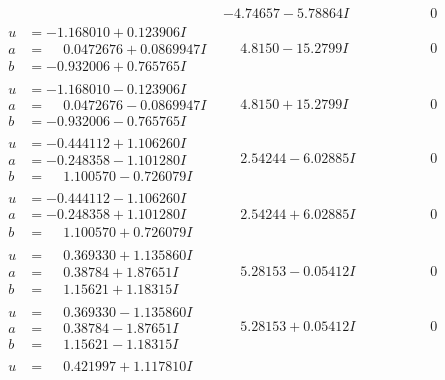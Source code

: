 \documentclass[1p]{elsarticle_modified}
\theoremstyle{definition}
\begin{document}
$$\begin{array}{c|c|c}
 & -4.74657 - 5.78864 I & \phantom{-0.000000 } 0 \\ \hline\begin{aligned}
u &= -1.168010 + 0.123906 I \\
a &= \phantom{-}0.0472676 + 0.0869947 I \\
b &= -0.932006 + 0.765765 I\end{aligned}
 & \phantom{-}4.8150 - 15.2799 I & \phantom{-0.000000 } 0 \\ \hline\begin{aligned}
u &= -1.168010 - 0.123906 I \\
a &= \phantom{-}0.0472676 - 0.0869947 I \\
b &= -0.932006 - 0.765765 I\end{aligned}
 & \phantom{-}4.8150 + 15.2799 I & \phantom{-0.000000 } 0 \\ \hline\begin{aligned}
u &= -0.444112 + 1.106260 I \\
a &= -0.248358 - 1.101280 I \\
b &= \phantom{-}1.100570 - 0.726079 I\end{aligned}
 & \phantom{-}2.54244 - 6.02885 I & \phantom{-0.000000 } 0 \\ \hline\begin{aligned}
u &= -0.444112 - 1.106260 I \\
a &= -0.248358 + 1.101280 I \\
b &= \phantom{-}1.100570 + 0.726079 I\end{aligned}
 & \phantom{-}2.54244 + 6.02885 I & \phantom{-0.000000 } 0 \\ \hline\begin{aligned}
u &= \phantom{-}0.369330 + 1.135860 I \\
a &= \phantom{-}0.38784 + 1.87651 I \\
b &= \phantom{-}1.15621 + 1.18315 I\end{aligned}
 & \phantom{-}5.28153 - 0.05412 I & \phantom{-0.000000 } 0 \\ \hline\begin{aligned}
u &= \phantom{-}0.369330 - 1.135860 I \\
a &= \phantom{-}0.38784 - 1.87651 I \\
b &= \phantom{-}1.15621 - 1.18315 I\end{aligned}
 & \phantom{-}5.28153 + 0.05412 I & \phantom{-0.000000 } 0 \\ \hline\begin{aligned}
u &= \phantom{-}0.421997 + 1.117810 I \\

\end{aligned}
\end{array}$$
\end{document}
